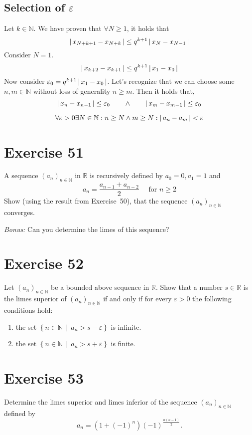 \documentclass[a4paper]{article}
\theoremstyle{definition}
\newcommand\abs[1]{\left|\thinspace #1\thinspace\right|}
\newcommand\setdef[2]{\left\{#1\,\middle|\,#2\right\}}
\newcommand\seq[1]{\left(#1\right)_{n\in\mathbb N}}
\begin{document}
\subsection{Selection of $\varepsilon$}
%
Let $k \in \mathbb N$. We have proven that $\forall N \geq 1$, it holds that
\[ \abs{x_{N+k+1} - x_{N+k}} \leq q^{k+1} \abs{x_N - x_{N-1}} \]
Consider $N = 1$.
\[ \abs{x_{k+2} - x_{k+1}} \leq q^{k+1} \abs{x_1 - x_0} \]
Now consider $\varepsilon_0 = q^{k+1} \abs{x_1 - x_0}$.
Let's recognize that we can choose some $n,m \in \mathbb N$ without loss of generality $n \geq m$.
Then it holds that,
\[ \abs{x_n - x_{n-1}} \leq \varepsilon_0 \qquad \land \qquad \abs{x_m - x_{m-1}} \leq \varepsilon_0 \]

\[ \forall \varepsilon > 0 \exists N \in \mathbb N: n \geq N \land m \geq N: \abs{a_n - a_m} < \varepsilon \]

\section{Exercise 51}
\begin{ex}
  A sequence $\seq{a_n}$ in $\mathbb R$ is recursively defined by $a_0 = 0, a_1 = 1$ and
  \[ a_n = \frac{a_{n-1} + a_{n-2}}{2} \quad\text{ for } n \geq 2 \]
  Show (using the result from Exercise~50), that the sequence $\seq{a_n}$ converges.

  \emph{Bonus:} Can you determine the limes of this sequence?
\end{ex}

\section{Exercise 52}
\begin{ex}
  Let $\seq{a_n}$ be a bounded above sequence in $\mathbb R$. Show that
  a number $s \in \mathbb R$ is the limes superior of $\seq{a_n}$ if and only if
  for every $\varepsilon > 0$ the following conditions hold:
  \begin{enumerate}
    \item the set $\setdef{n \in \mathbb N}{a_n > s - \varepsilon}$ is infinite.
    \item the set $\setdef{n \in \mathbb N}{a_n > s + \varepsilon}$ is finite.
  \end{enumerate}
\end{ex}

\section{Exercise 53}
\begin{ex}
  Determine the limes superior and limes inferior of the sequence $\seq{a_n}$
  defined by
  \[ a_n = \left(1 + (-1)^n\right) (-1)^{\frac{n (n-1)}{2}}. \]
\end{ex}
\end{document}
